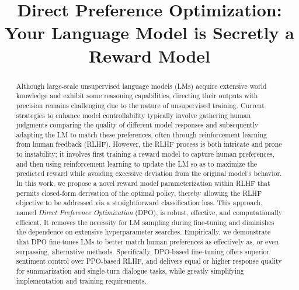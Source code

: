 \title{Direct Preference Optimization: Your Language Model is Secretly a Reward Model}

\begin{abstract}
Although large-scale unsupervised language models (LMs) acquire extensive world knowledge and exhibit some reasoning capabilities, directing their outputs with precision remains challenging due to the nature of unsupervised training. Current strategies to enhance model controllability typically involve gathering human judgments comparing the quality of different model responses and subsequently adapting the LM to match these preferences, often through reinforcement learning from human feedback (RLHF). However, the RLHF process is both intricate and prone to instability; it involves first training a reward model to capture human preferences, and then using reinforcement learning to update the LM so as to maximize the predicted reward while avoiding excessive deviation from the original model's behavior. In this work, we propose a novel reward model parameterization within RLHF that permits closed-form derivation of the optimal policy, thereby allowing the RLHF objective to be addressed via a straightforward classification loss. This approach, named \textit{Direct Preference Optimization} (DPO), is robust, effective, and computationally efficient. It removes the necessity for LM sampling during fine-tuning and diminishes the dependence on extensive hyperparameter searches. Empirically, we demonstrate that DPO fine-tunes LMs to better match human preferences as effectively as, or even surpassing, alternative methods. Specifically, DPO-based fine-tuning offers superior sentiment control over PPO-based RLHF, and delivers equal or higher response quality for summarization and single-turn dialogue tasks, while greatly simplifying implementation and training requirements.
\end{abstract}

